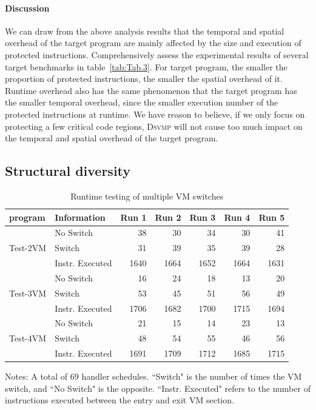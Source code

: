 \documentclass[times]{secauth}
\newcommand{\DSVMP}{\textsc{Dsvmp }}
\begin{document}
\paragraph*{Discussion} We can draw from the above analysis results that
the temporal and spatial overhead of the target program are mainly affected by the size and execution of protected instructions.
Comprehensively assess the experimental results of several target benchmarks in table~\ref{tab:Tab.3}. For target program, the smaller the proportion of protected instructions, the smaller the spatial overhead of it.
Runtime overhead also has the same phenomenon that the target program has the smaller temporal overhead,
since the smaller execution number of the protected instructions at runtime.
We have reason to believe, if we only focus on protecting a few critical code regions,
\DSVMP will not cause too much impact on the temporal and spatial overhead of the target program.



\subsection{Structural diversity\label{sec:s-d}}

\begin{table}[!t]
\scriptsize
\begin{center}
\caption{Runtime testing of multiple VM switches\label{tab:Tab.4}}
{\begin{tabular}{@{}llrrrrr@{}}\hline
  \textbf{program} & \textbf{Information} & \textbf{Run 1} & \textbf{Run 2} & \textbf{Run 3} & \textbf{Run 4} & \textbf{Run 5}\\
  \hline
   & No Switch & 38 & 30 & 34 & 30 & 41 \\
  Test-2VM & Switch & 31 & 39 & 35 & 39 & 28 \\
   & Instr. Executed & 1640 & 1664 & 1652 & 1664 & 1631 \\
  \hline
   & No Switch & 16 & 24 & 18 & 13 & 20 \\
  Test-3VM & Switch & 53 & 45 & 51 & 56 & 49 \\
   & Instr. Executed & 1706 & 1682 & 1700 & 1715 & 1694 \\
   \hline
   & No Switch & 21 & 15 & 14 & 23 & 13 \\
  Test-4VM & Switch & 48 & 54 & 55 & 46 & 56 \\
   & Instr. Executed & 1691 & 1709 & 1712 & 1685 & 1715 \\
  \hline
\end{tabular}}{}
\end{center}
Notes: A total of 69 handler schedules. ``Switch" is the number of times the VM switch, and ``No Switch" is the opposite. ``Instr. Executed" refers to the number of instructions executed between the entry and exit VM section.
\end{table}
\end{document}
